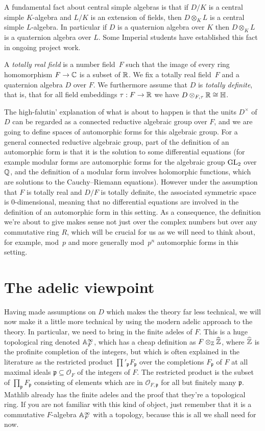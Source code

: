 A fundamental fact about central simple algebras is that if $D/K$
is a central simple $K$-algebra and $L/K$ is an extension of fields, then $D\otimes_KL$
is a central simple $L$-algebra. In particular if $D$ is a quaternion algebra over $K$
then $D\otimes_KL$ is a quaternion algebra over $L$. Some Imperial students have established
this fact in ongoing project work.

A \emph{totally real field} is a number field~$F$ such that the image of every ring
homomorphism $F\to\mathbb{C}$ is a subset of $\mathbb{R}$. We fix a totally real field~$F$ and a
quaternion algebra $D$ over $F$. We furthermore assume that $D$ is \emph{totally definite}, that is,
that for all field embeddings $\tau:F\to\mathbb{R}$ we have $D\otimes_{F,\tau}\mathbb{R}\cong\mathbb{H}$.

The high-falutin' explanation of what is about to happen is that the units $D^\times$ of $D$
can be regarded as a connected reductive algebraic group over $F$, and we are going to define spaces
of automorphic forms for this algebraic group. For a general connected reductive algebraic group,
part of the definition of an automorphic form is that it is the solution to some differential
equations (for example modular forms are automorphic forms for the algebraic group $\operatorname{GL}_2$ over
$\mathbb{Q}$, and the definition of a modular form involves holomorphic functions, which are solutions to
the Cauchy--Riemann equations). However under the assumption that $F$ is totally real and $D/F$ is
totally definite, the associated symmetric space is 0-dimensional, meaning that no differential
equations are involved in the definition
of an automorphic form in this setting. As a consequence, the definition we're about to give
makes sense not just over the complex numbers but over any commutative ring $R$, which will
be crucial for us as we will need to think about, for example, mod~$p$ and more generally
mod~$p^n$ automorphic forms in this setting.

\section{The adelic viewpoint}

Having made assumptions on $D$ which makes the theory far less technical, we will now
make it a little more technical by using the modern adelic approach to the theory.
In particular, we need to bring in the finite adeles of $F$. This is a huge topological ring
denoted $\mathbb{A}_F^\infty$, which has a cheap definition as $F\otimes_{\mathbb{Z}}\widehat{\mathbb{Z}}$, where $\widehat{\mathbb{Z}}$ is
the profinite completion of the integers, but which is often explained in the literature
as the restricted product $\prod'_{\mathfrak{p}}F_{\mathfrak{p}}$ over the completions
$F_{\mathfrak{p}}$ of $F$ at all maximal ideals $\mathfrak{p}\subseteq\mathcal{O}_F$ of the
integers of $F$. The restricted product is the subset of $\prod_{\mathfrak{p}}F_{\mathfrak{p}}$
consisting of elements which are in $\mathcal{O}_{F,\mathfrak{p}}$ for all but finitely many
$\mathfrak{p}$.
Mathlib already has the finite adeles and the proof that they're a topological ring. If you are
not familiar with this kind of object, just remember that it is a commutative
$F$-algebra $\mathbb{A}_F^\infty$ with a topology, because this is all we shall need for now.

